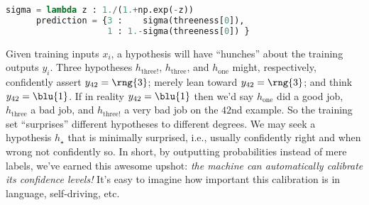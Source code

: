   \begin{lstlisting}[language=Python, basicstyle=\footnotesize\ttfamily]
      sigma = lambda z : 1./(1.+np.exp(-z))
      prediction = {3 :    sigma(threeness[0]),
                    1 : 1.-sigma(threeness[0]) }
  \end{lstlisting}
  Given training inputs $x_i$, a hypothesis will have ``hunches'' about the
  training outputs $y_i$.  Three hypotheses $h_{\text{three!}}$,
  $h_{\text{three}}$, and $h_{\text{one}}$ might, respectively, confidently
  assert $y_{42}={\rng{3}}$; merely lean toward $y_{42}={\rng{3}}$; and think $y_{42}={\blu{1}}$.  If
  in reality $y_{42}={\blu{1}}$ then we'd say $h_{\text{one}}$ did a good job, $h_{\text{three}}$ a bad
  job, and $h_{\text{three!}}$ a very bad job on the $42$nd example.
  So the training set ``surprises'' different hypotheses to different degrees.
  We may seek a hypothesis $h_\star$ that is minimally surprised, i.e., usually
  confidently right and when wrong not confidently so.
  In short, by outputting probabilities instead of mere labels, we've earned
  this awesome upshot: \emph{the machine can automatically calibrate its
  confidence levels!}
    It's easy to imagine how important this calibration is in language, self-driving, etc.






